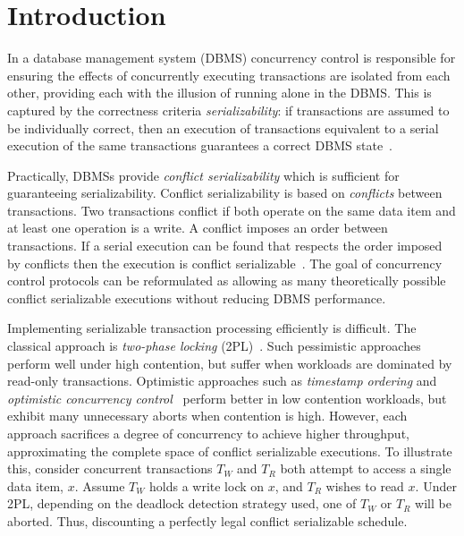 \section{Introduction}
\label{sec:introduction}

In a database management system (DBMS) concurrency control is responsible for ensuring the 
effects of 
concurrently executing transactions are isolated from each other, providing 
each with the illusion of running alone in the
DBMS. This is captured by the correctness criteria \emph{serializability}: if
transactions are assumed to be individually correct, then an execution of transactions 
equivalent to a serial execution of the same 
transactions guarantees a correct DBMS state~\cite{DBLP:books/aw/BernsteinHG87}.

Practically, DBMSs provide \emph{conflict serializability} which is sufficient for
guaranteeing serializability. Conflict serializability is based on \emph{conflicts} between 
transactions. Two transactions conflict if 
both operate on the same data item and at 
least one operation is a write. A conflict imposes an order between transactions.
If a serial execution can be found that respects the order imposed by conflicts then the
execution is conflict serializable~\cite{DBLP:books/aw/BernsteinHG87}. The goal of 
concurrency control protocols can be reformulated as allowing as many theoretically 
possible conflict serializable executions without reducing DBMS performance.

Implementing serializable transaction processing efficiently is difficult.
The classical approach 
is \emph{two-phase locking} (2PL)~\cite{DBLP:journals/cacm/EswarranGLT76}.
Such pessimistic approaches perform well under high contention, but suffer when
workloads are dominated by read-only transactions. Optimistic approaches such as 
\emph{timestamp ordering} and \emph{optimistic concurrency control}~\cite{DBLP:journals/tods/KungR81} perform better in low contention workloads, but 
exhibit many unnecessary aborts when contention is high.
However, each 
approach sacrifices a degree of concurrency to achieve higher throughput, 
approximating the complete space of conflict serializable executions. To illustrate this, 
consider concurrent transactions $T_W$ and $T_R$ both attempt to access a single data item, 
$x$. Assume $T_W$ holds a write lock on $x$, and $T_R$ wishes to read $x$. Under 2PL, 
depending on the deadlock detection strategy used, one of $T_W$ or $T_R$ will be aborted. 
Thus, discounting a perfectly legal conflict serializable schedule. 


